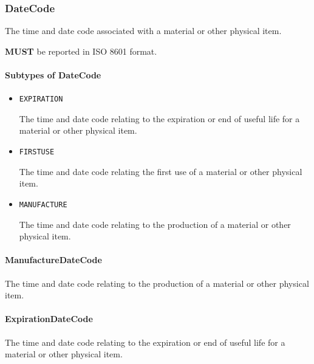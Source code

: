 \FloatBarrier

\subsubsection{DateCode}
\label{sec:DateCode}



The time and date code associated with a material or other physical item.
  
  \textbf{MUST} be reported in ISO 8601 format.


\paragraph{Subtypes of DateCode}\mbox{}
\label{sec:Subtypes of DateCode}

\begin{itemize}

\item \texttt{EXPIRATION}


The time and date code relating to the expiration or end of useful life for a material or other physical item.

\item \texttt{FIRST\textunderscore USE}


The time and date code relating the first use of a material or other physical item.

\item \texttt{MANUFACTURE}


The time and date code relating to the production of a material or other physical item.


\end{itemize}

\paragraph{ManufactureDateCode}\mbox{}
\label{sec:ManufactureDateCode}


The time and date code relating to the production of a material or other physical item.


\paragraph{ExpirationDateCode}\mbox{}
\label{sec:ExpirationDateCode}


The time and date code relating to the expiration or end of useful life for a material or other physical item.


